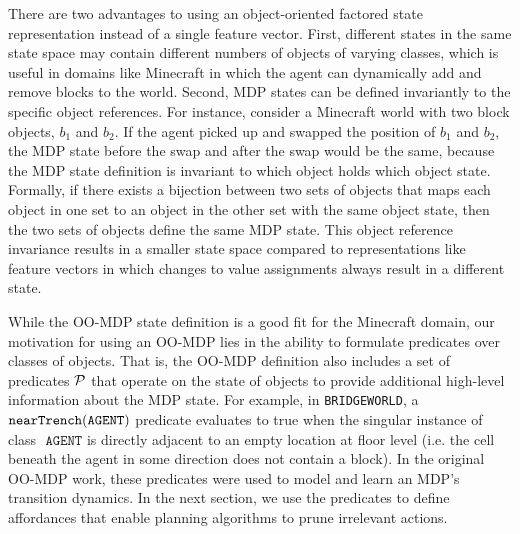 \documentclass[]{article}
\newcommand{\stnote}[1]{\textcolor{Blue}{\textbf{ST: #1}}}
\newcommand{\dnote}[1]{\textcolor{Orange}{\textbf{D: #1}}}
\begin{document}
There are two advantages to using an object-oriented factored state
representation instead of a single feature vector. First, different
states in the same state space may contain different numbers of
objects of varying classes, which is useful in domains like Minecraft
in which the agent can dynamically add and remove blocks to the
world. Second, MDP states can be defined invariantly to the specific
object references.  For instance, consider a Minecraft world with two
block objects, $b_1$ and $b_2$.  If the agent picked up and swapped
the position of $b_1$ and $b_2$, the MDP state before the swap and
after the swap would be the same, because the MDP state definition is
invariant to which object holds which object state.  Formally, if
there exists a bijection between two sets of objects that maps each
object in one set to an object in the other set with the same object
state, then the two sets of objects define the same MDP state.  This
object reference invariance results in a smaller state space compared
to representations like feature vectors in which changes to value
assignments always result in a different state.


While the OO-MDP state definition is a good fit for the Minecraft
domain, our motivation for using an OO-MDP lies in the ability to
formulate predicates over classes of objects. That is, the OO-MDP
definition also includes a set of predicates ${\cal P}$ that operate
on the state of objects to provide additional high-level information
about the MDP state. For example, in \texttt{BRIDGEWORLD}, a ${\tt
  nearTrench}({\tt AGENT})$ predicate evaluates to true when the singular
instance of class $\texttt{ AGENT}$ is directly adjacent to an empty location
at floor level (i.e. the cell beneath the agent in some direction does not
contain a block). In the original OO-MDP work, these predicates were used
to model and learn an MDP's transition dynamics. In the next section,
we use the predicates to define affordances that enable planning
algorithms to prune irrelevant actions.
\end{document}
